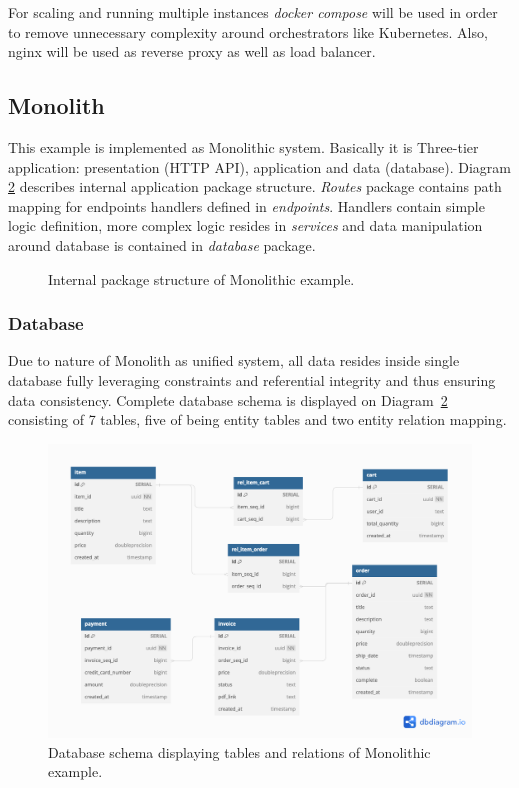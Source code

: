 For scaling and running multiple instances \textit{docker compose} will be used in order to remove unnecessary complexity around orchestrators like Kubernetes. Also, nginx will be used as reverse proxy as well as load balancer.

\subsection{Monolith}
This example is implemented as Monolithic system. Basically it is Three-tier application: presentation (HTTP API), application and data (database). Diagram \ref{img:monolith_db_schema} describes internal application package structure. \textit{Routes} package contains path mapping for endpoints handlers defined in \textit{endpoints}. Handlers contain simple logic definition, more complex logic resides in \textit{services} and data manipulation around database is contained in \textit{database} package.

\begin{figure}
    \centering
    
    \caption{Internal package structure of Monolithic example. \label{img:monolith_package}}
\end{figure}


\subsubsection{Database}
Due to nature of Monolith as unified system, all data resides inside single database fully leveraging constraints and referential integrity and thus ensuring data consistency. Complete database schema is displayed on Diagram~\ref{img:monolith_db_schema} consisting of 7 tables, five of being entity tables and two entity relation mapping.

\begin{figure}
    \centering
    \includegraphics[width=\textwidth]{images/monolith_db_schema.png}
    \caption{Database schema displaying tables and relations of Monolithic example. \label{img:monolith_db_schema}}
\end{figure}



